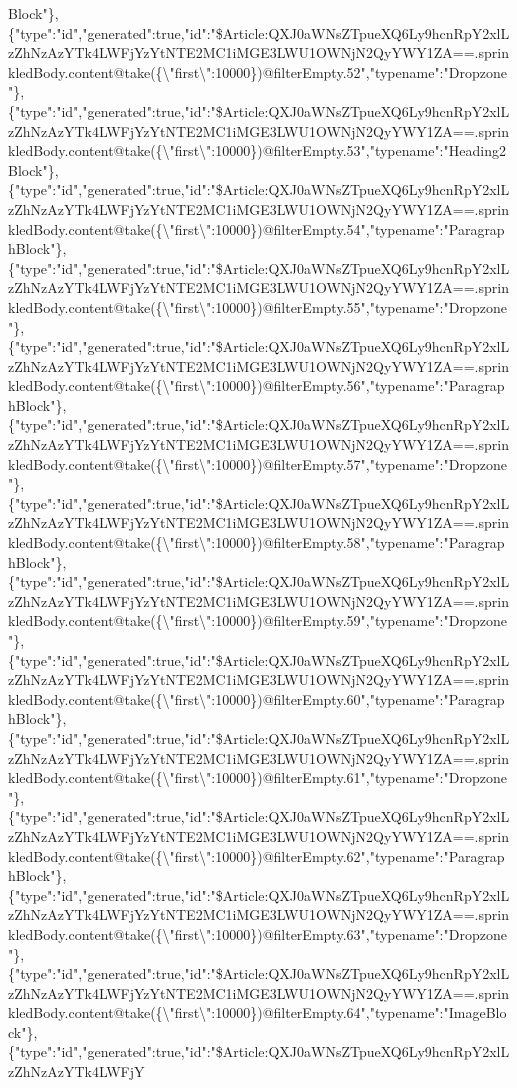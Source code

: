 Block"\},\{"type":"id","generated":true,"id":"\$Article:QXJ0aWNsZTpueXQ6Ly9hcnRpY2xlLzZhNzAzYTk4LWFjYzYtNTE2MC1iMGE3LWU1OWNjN2QyYWY1ZA==.sprinkledBody.content@take(\{\textbackslash{}"first\textbackslash{}":10000\})@filterEmpty.52","typename":"Dropzone"\},\{"type":"id","generated":true,"id":"\$Article:QXJ0aWNsZTpueXQ6Ly9hcnRpY2xlLzZhNzAzYTk4LWFjYzYtNTE2MC1iMGE3LWU1OWNjN2QyYWY1ZA==.sprinkledBody.content@take(\{\textbackslash{}"first\textbackslash{}":10000\})@filterEmpty.53","typename":"Heading2Block"\},\{"type":"id","generated":true,"id":"\$Article:QXJ0aWNsZTpueXQ6Ly9hcnRpY2xlLzZhNzAzYTk4LWFjYzYtNTE2MC1iMGE3LWU1OWNjN2QyYWY1ZA==.sprinkledBody.content@take(\{\textbackslash{}"first\textbackslash{}":10000\})@filterEmpty.54","typename":"ParagraphBlock"\},\{"type":"id","generated":true,"id":"\$Article:QXJ0aWNsZTpueXQ6Ly9hcnRpY2xlLzZhNzAzYTk4LWFjYzYtNTE2MC1iMGE3LWU1OWNjN2QyYWY1ZA==.sprinkledBody.content@take(\{\textbackslash{}"first\textbackslash{}":10000\})@filterEmpty.55","typename":"Dropzone"\},\{"type":"id","generated":true,"id":"\$Article:QXJ0aWNsZTpueXQ6Ly9hcnRpY2xlLzZhNzAzYTk4LWFjYzYtNTE2MC1iMGE3LWU1OWNjN2QyYWY1ZA==.sprinkledBody.content@take(\{\textbackslash{}"first\textbackslash{}":10000\})@filterEmpty.56","typename":"ParagraphBlock"\},\{"type":"id","generated":true,"id":"\$Article:QXJ0aWNsZTpueXQ6Ly9hcnRpY2xlLzZhNzAzYTk4LWFjYzYtNTE2MC1iMGE3LWU1OWNjN2QyYWY1ZA==.sprinkledBody.content@take(\{\textbackslash{}"first\textbackslash{}":10000\})@filterEmpty.57","typename":"Dropzone"\},\{"type":"id","generated":true,"id":"\$Article:QXJ0aWNsZTpueXQ6Ly9hcnRpY2xlLzZhNzAzYTk4LWFjYzYtNTE2MC1iMGE3LWU1OWNjN2QyYWY1ZA==.sprinkledBody.content@take(\{\textbackslash{}"first\textbackslash{}":10000\})@filterEmpty.58","typename":"ParagraphBlock"\},\{"type":"id","generated":true,"id":"\$Article:QXJ0aWNsZTpueXQ6Ly9hcnRpY2xlLzZhNzAzYTk4LWFjYzYtNTE2MC1iMGE3LWU1OWNjN2QyYWY1ZA==.sprinkledBody.content@take(\{\textbackslash{}"first\textbackslash{}":10000\})@filterEmpty.59","typename":"Dropzone"\},\{"type":"id","generated":true,"id":"\$Article:QXJ0aWNsZTpueXQ6Ly9hcnRpY2xlLzZhNzAzYTk4LWFjYzYtNTE2MC1iMGE3LWU1OWNjN2QyYWY1ZA==.sprinkledBody.content@take(\{\textbackslash{}"first\textbackslash{}":10000\})@filterEmpty.60","typename":"ParagraphBlock"\},\{"type":"id","generated":true,"id":"\$Article:QXJ0aWNsZTpueXQ6Ly9hcnRpY2xlLzZhNzAzYTk4LWFjYzYtNTE2MC1iMGE3LWU1OWNjN2QyYWY1ZA==.sprinkledBody.content@take(\{\textbackslash{}"first\textbackslash{}":10000\})@filterEmpty.61","typename":"Dropzone"\},\{"type":"id","generated":true,"id":"\$Article:QXJ0aWNsZTpueXQ6Ly9hcnRpY2xlLzZhNzAzYTk4LWFjYzYtNTE2MC1iMGE3LWU1OWNjN2QyYWY1ZA==.sprinkledBody.content@take(\{\textbackslash{}"first\textbackslash{}":10000\})@filterEmpty.62","typename":"ParagraphBlock"\},\{"type":"id","generated":true,"id":"\$Article:QXJ0aWNsZTpueXQ6Ly9hcnRpY2xlLzZhNzAzYTk4LWFjYzYtNTE2MC1iMGE3LWU1OWNjN2QyYWY1ZA==.sprinkledBody.content@take(\{\textbackslash{}"first\textbackslash{}":10000\})@filterEmpty.63","typename":"Dropzone"\},\{"type":"id","generated":true,"id":"\$Article:QXJ0aWNsZTpueXQ6Ly9hcnRpY2xlLzZhNzAzYTk4LWFjYzYtNTE2MC1iMGE3LWU1OWNjN2QyYWY1ZA==.sprinkledBody.content@take(\{\textbackslash{}"first\textbackslash{}":10000\})@filterEmpty.64","typename":"ImageBlock"\},\{"type":"id","generated":true,"id":"\$Article:QXJ0aWNsZTpueXQ6Ly9hcnRpY2xlLzZhNzAzYTk4LWFjY